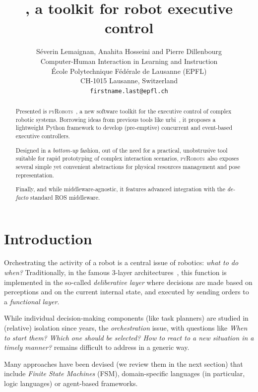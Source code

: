 \documentclass[a4paper, 10pt, conference]{ieeeconf}      %
\title{\LARGE \bf
    \pyRobots, a toolkit for robot executive control
}
\author{Séverin Lemaignan, Anahita Hosseini and Pierre Dillenbourg\\
Computer-Human Interaction in Learning and Instruction \\
École Polytechnique Fédérale de Lausanne (EPFL) \\
CH-1015 Lausanne, Switzerland \\
{\tt\small firstname.last@epfl.ch}
}
\newcommand{\pyRobots}{\textsc{pyRobots}\ }
\begin{document}
\maketitle
\thispagestyle{empty}
\pagestyle{empty}


\begin{abstract}

Presented is \pyRobots, a new software toolkit for the executive control of
complex robotic systems. Borrowing ideas from previous tools like {\sc
urbi}~\cite{baillie2005urbi}, it proposes a lightweight Python framework to
develop (pre-emptive) concurrent and event-based executive controllers.

Designed in a \emph{bottom-up} fashion, out of the need for a practical,
unobstrusive tool suitable for rapid prototyping of complex interaction
scenarios, \pyRobots also exposes several simple yet convenient abstractions for
physical resources management and pose representation.

Finally, and while middleware-agnostic, it features advanced integration with
the \textit{de-facto} standard ROS middleware.

\end{abstract}


\section{Introduction}

Orchestrating the activity of a robot is a central issue of robotics: \emph{what
to do when?} Traditionally, in the famous 3-layer architectures~,
this function is implemented in the so-called \emph{deliberative layer} where
decisions are made based on perceptions and on the current internal state, and
executed by sending orders to a \emph{functional layer}.

While individual decision-making components (like task planners) are studied in
(relative) isolation since years, the \emph{orchestration} issue, with questions
like \textit{When to start them? Which one should be selected? How to react to a
new situation in a timely manner?} remains difficult to address in a generic
way.

Many approaches have been devised (we review them in the next section) that
include \emph{Finite State Machines} (FSM), domain-specific languages (in
particular, logic languages) or agent-based frameworks.
\end{document}
